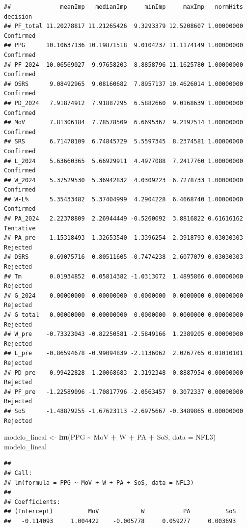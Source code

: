 \documentclass[
]{article}
\newenvironment{Shaded}{\begin{snugshade}}{\end{snugshade}}
\newcommand{\AttributeTok}[1]{\textcolor[rgb]{0.13,0.29,0.53}{#1}}
\newcommand{\FunctionTok}[1]{\textcolor[rgb]{0.13,0.29,0.53}{\textbf{#1}}}
\newcommand{\NormalTok}[1]{#1}
\newcommand{\OtherTok}[1]{\textcolor[rgb]{0.56,0.35,0.01}{#1}}
\newcommand{\SpecialCharTok}[1]{\textcolor[rgb]{0.81,0.36,0.00}{\textbf{#1}}}
\begin{document}
\begin{verbatim}
##              meanImp   medianImp     minImp     maxImp   normHits  decision
## PF_total 11.20278817 11.21265426  9.3293379 12.5208607 1.00000000 Confirmed
## PPG      10.10637136 10.19871518  9.0104237 11.1174149 1.00000000 Confirmed
## PF_2024  10.06569027  9.97658203  8.8858796 11.1625780 1.00000000 Confirmed
## OSRS      9.08492965  9.08160682  7.8957137 10.4626014 1.00000000 Confirmed
## PD_2024   7.91874912  7.91887295  6.5882660  9.0168639 1.00000000 Confirmed
## MoV       7.81306184  7.78578509  6.6695367  9.2197514 1.00000000 Confirmed
## SRS       6.71478109  6.74845729  5.5597345  8.2374581 1.00000000 Confirmed
## L_2024    5.63660365  5.66929911  4.4977088  7.2417760 1.00000000 Confirmed
## W_2024    5.37529530  5.36942832  4.0309223  6.7278733 1.00000000 Confirmed
## W-L%      5.35433482  5.37404999  4.2904228  6.4668740 1.00000000 Confirmed
## PA_2024   2.22378809  2.26944449 -0.5260092  3.8816822 0.61616162 Tentative
## PA_pre    1.15318493  1.32653540 -1.3396254  2.3918793 0.03030303  Rejected
## DSRS      0.69075716  0.80511605 -0.7474238  2.6077079 0.03030303  Rejected
## Tm        0.01934852  0.05814382 -1.0313072  1.4895866 0.00000000  Rejected
## G_2024    0.00000000  0.00000000  0.0000000  0.0000000 0.00000000  Rejected
## G_total   0.00000000  0.00000000  0.0000000  0.0000000 0.00000000  Rejected
## W_pre    -0.73323043 -0.82250581 -2.5849166  1.2389205 0.00000000  Rejected
## L_pre    -0.86594678 -0.99094839 -2.1136062  2.0267765 0.01010101  Rejected
## PD_pre   -0.99422828 -1.20068683 -2.3192348  0.8887954 0.00000000  Rejected
## PF_pre   -1.22589096 -1.70817796 -2.0563457  0.3072337 0.00000000  Rejected
## SoS      -1.48879255 -1.67623113 -2.6975667 -0.3489865 0.00000000  Rejected
\end{verbatim}

\begin{Shaded}
\begin{Highlighting}[]
\NormalTok{modelo\_lineal }\OtherTok{\textless{}{-}} \FunctionTok{lm}\NormalTok{(PPG }\SpecialCharTok{\textasciitilde{}}\NormalTok{ MoV  }\SpecialCharTok{+}\NormalTok{ W }\SpecialCharTok{+}\NormalTok{ PA }\SpecialCharTok{+}\NormalTok{ SoS, }\AttributeTok{data =}\NormalTok{ NFL3)}
\NormalTok{modelo\_lineal}
\end{Highlighting}
\end{Shaded}

\begin{verbatim}
## 
## Call:
## lm(formula = PPG ~ MoV + W + PA + SoS, data = NFL3)
## 
## Coefficients:
## (Intercept)          MoV            W           PA          SoS  
##   -0.114093     1.004422    -0.005778     0.059277     0.003693
\end{verbatim}
\end{document}
